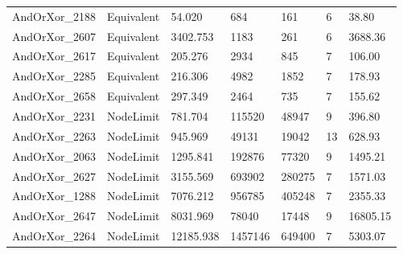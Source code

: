 \begin{tabular}{lllllll}
AndOrXor\_2188 & Equivalent & 54.020 & 684 & 161 & 6 & 38.80 \\
AndOrXor\_2607 & Equivalent & 3402.753 & 1183 & 261 & 6 & 3688.36 \\
AndOrXor\_2617 & Equivalent & 205.276 & 2934 & 845 & 7 & 106.00 \\
AndOrXor\_2285 & Equivalent & 216.306 & 4982 & 1852 & 7 & 178.93 \\
AndOrXor\_2658 & Equivalent & 297.349 & 2464 & 735 & 7 & 155.62 \\
AndOrXor\_2231 & NodeLimit & 781.704 & 115520 & 48947 & 9 & 396.80 \\
AndOrXor\_2263 & NodeLimit & 945.969 & 49131 & 19042 & 13 & 628.93 \\
AndOrXor\_2063 & NodeLimit & 1295.841 & 192876 & 77320 & 9 & 1495.21 \\
AndOrXor\_2627 & NodeLimit & 3155.569 & 693902 & 280275 & 7 & 1571.03 \\
AndOrXor\_1288 & NodeLimit & 7076.212 & 956785 & 405248 & 7 & 2355.33 \\
AndOrXor\_2647 & NodeLimit & 8031.969 & 78040 & 17448 & 9 & 16805.15 \\
AndOrXor\_2264 & NodeLimit & 12185.938 & 1457146 & 649400 & 7 & 5303.07 \\
\bottomrule
\end{tabular}
